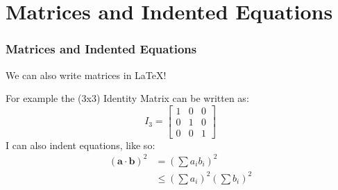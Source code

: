 \documentclass{beamer}
\begin{document}
    \section{Matrices and Indented Equations}
    {
        \begin{frame}
            \frametitle{Matrices and Indented Equations}
            We can also write matrices in \LaTeX{}!

            For example the (3x3) Identity Matrix can be written as:
            \begin{equation*}
                I_{3} = \begin{bmatrix}
                    1 & 0 & 0 \\
                    0 & 1 & 0 \\
                    0 & 0 & 1
                \end{bmatrix}
            \end{equation*}
            \pause
            I can also indent equations, like so:
            \begin{align*}
                (\textbf{a}\cdot\textbf{b})^{2} &= (\sum a_{i}b_{i})^{2} \\
                &\leq (\sum a_{i})^{2}(\sum b_{i})^{2}
            \end{align*}
        \end{frame}
    }
\end{document}
